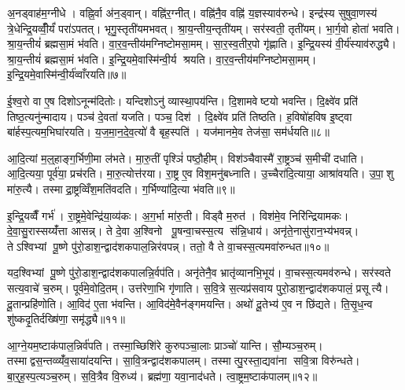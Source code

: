 अ॒नड्वाह॑म॒ग्नीधे। वह्नि॒र्वा अ॑न॒ड्वान्। वह्नि॑र॒ग्नीत्। वह्नि॑नै॒व वह्नि॑ य॒ज्ञस्याव॑रुन्धे। इन्द्र॑स्य सुषुवा॒णस्य॑ त्रे॒धेन्द्रि॒यव्वीँ॒र्यं॑ परा॑ऽपतत्। भृगु॒स्तृती॑यमभवत्। श्रा॒य॒न्तीय॒न्तृती॑यम्। सर॑स्वती॒ तृती॑यम्। भा॒र्ग॒वो होता॑ भवति। श्रा॒य॒न्तीयं॑ ब्रह्मसा॒मं भ॑वति। वा॒र॒व॒न्तीय॑मग्निष्टोमसा॒मम्। सा॒र॒स्व॒तीर॒पो गृ॑ह्णाति। इ॒न्द्रि॒यस्य॑ वी॒र्य॑स्याव॑रुद्ध्यै। श्रा॒य॒न्तीयं॑ ब्रह्मसा॒मं भ॑वति। इ॒न्द्रि॒यमे॒वास्मि॑न्वी॒र्य श्रयति। वा॒र॒व॒न्तीय॑मग्निष्टोमसा॒मम्। इ॒न्द्रि॒यमे॒वास्मि॑न्वी॒र्य॑व्वाँरयति॥७॥\anuvakamend[वि॒राट्प्र॒जाप॑ति॒रश्व॑ प्र॒जाप॑ते॒राप्त्यै॑ यजते ब्रह्मसा॒मं भ॑वति स॒प्त च॑]

ई॒श्व॒रो वा ए॒ष दिशोऽनून्म॑दितोः। यन्दिशोऽनु॑ व्यास्था॒पय॑न्ति। दि॒शामवेष्टयो भवन्ति। दि॒क्ष्वे॑व प्रति॑ तिष्ठ॒त्यनु॑न्मादाय। पञ्च॑ दे॒वता॑ यजति। पञ्च॒ दिश॑। दि॒क्ष्वे॑व प्रति॑ तिष्ठति। ह॒विषो॑हविष इ॒ष्ट्वा बा॑र्\mbox{}हस्प॒त्यम॒भिघा॑रयति। य॒ज॒मा॒न॒दे॒व॒त्यो॑ वै बृह॒स्पति॑। यज॑मानमे॒व तेज॑सा॒ सम॑र्धयति॥८॥

आ॒दि॒त्यां म॒ल्॒हाङ्ग॒र्भिणी॒मा ल॑भते। मा॒रु॒तीं पृश्ञिं॑ पष्ठौ॒हीम्। विश॑ञ्चैवास्मै॑ रा॒ष्ट्रञ्च॑ स॒मीची॑ दधाति। आ॒दि॒त्यया॒ पूर्व॑या॒ प्रच॑रति। मा॒रु॒त्योत्त॑रया। रा॒ष्ट्र ए॒व विश॒मनु॑बध्नाति। उ॒च्चैरा॑दि॒त्याया॒ आश्रा॑वयति। उ॒पा॒शु मा॑रु॒त्यै। तस्माद्रा॒ष्ट्रव्विँश॒मति॑वदति। ग॒र्भिण्या॑दि॒त्या भ॑वति॥९॥

इ॒न्द्रि॒यव्वैँ गर्भ॑। रा॒ष्ट्रमे॒वेन्द्रि॑या॒व्य॑कः। अ॒ग॒र्भा मा॑रु॒ती। विड्वै म॒रुत॑। विश॑मे॒व निरि॑न्द्रियामकः। दे॒वा॒सु॒रास्सय्यँ॑त्ता आसन्न्। ते दे॒वा अ॒श्विनो पू॒षन्वा॒चस्स॒त्य स॑न्नि॒धाय॑। अनृ॑ते॒नासु॑रान॒भ्य॑भवन्न्। तेऽश्विभ्यां पू॒ष्णे पु॑रो॒डाश॒न्द्वाद॑शकपाल॒न्निर॑वपन्न्। ततो॒ वै ते वा॒चस्स॒त्यमवा॑रुन्धत॥१०॥

यद॒श्विभ्यां पू॒ष्णे पु॑रो॒डाश॒न्द्वाद॑शकपालन्नि॒र्वप॑ति। अनृ॑तेनै॒व भ्रातृ॑व्यानभि॒भूय॑। वा॒चस्स॒त्यमव॑रुन्धे। सर॑स्वते सत्य॒वाचे॑ च॒रुम्। पूर्व॑मे॒वोदि॒तम्। उत्त॑रेणा॒भि गृ॑णाति। स॒वि॒त्रे स॒त्यप्र॑सवाय पुरो॒डाश॒न्द्वाद॑शकपालं॒ प्रसूत्यै। दू॒तान्प्रहि॑णोति। आ॒विद॑ ए॒ता भ॑वन्ति। आ॒विद॑मे॒वैन॑ङ्गमयन्ति। अथो॑ दू॒तेभ्य॑ ए॒व न छि॑द्यते। ति॒सृ॒ध॒न्व शु॑ष्कदृ॒तिर्दख्षि॑णा॒ समृ॑द्ध्यै॥११॥\anuvakamend[अ॒र्ध॒य॒ति॒ भ॒व॒त्य॒रु॒न्ध॒त॒ ग॒म॒य॒न्ति॒ द्वे च॑]

आ॒ग्ने॒यम॒ष्टाक॑पाल॒न्निर्व॑पति। तस्मा॒च्छिशि॑रे कुरुपञ्चा॒लाः प्राञ्चो॑ यान्ति। सौ॒म्यञ्च॒रुम्। तस्माद्वस॒न्तव्व्यँ॑व॒साया॑दयन्ति। सा॒वि॒त्रन्द्वाद॑शकपालम्। तस्मात्पु॒रस्ता॒द्यवा॑ना सवि॒त्रा विरु॑न्धते। बा॒र्॒ह॒स्प॒त्यञ्च॒रुम्। स॒वि॒त्रैव वि॒रुध्य॑। ब्रह्म॑णा॒ यवा॒नाद॑धते। त्वा॒ष्ट्रम॒ष्टाक॑पालम्॥१२॥

